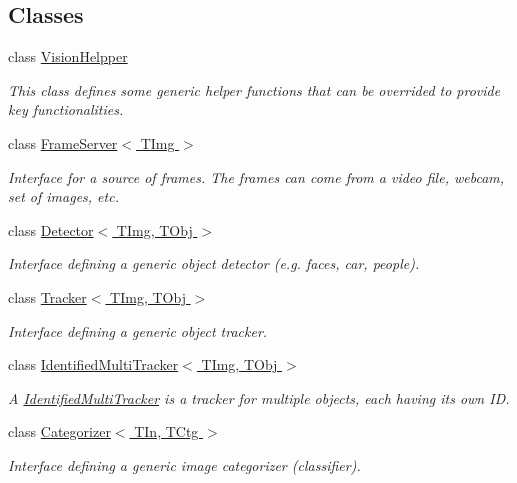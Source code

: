 \subsection*{Classes}
\begin{DoxyCompactItemize}
\item 
class \hyperlink{class_vision_core_1_1_abstractions_1_1_vision_helpper}{Vision\+Helpper}
\begin{DoxyCompactList}\small\item\em This class defines some generic helper functions that can be overrided to provide key functionalities. \end{DoxyCompactList}\item 
class \hyperlink{class_vision_core_1_1_interfaces_1_1_frame_server}{Frame\+Server$<$ T\+Img $>$}
\begin{DoxyCompactList}\small\item\em Interface for a source of frames. The frames can come from a video file, webcam, set of images, etc. \end{DoxyCompactList}\item 
class \hyperlink{class_vision_core_1_1_interfaces_1_1_detector}{Detector$<$ T\+Img, T\+Obj $>$}
\begin{DoxyCompactList}\small\item\em Interface defining a generic object detector (e.\+g. faces, car, people). \end{DoxyCompactList}\item 
class \hyperlink{class_vision_core_1_1_interfaces_1_1_tracker}{Tracker$<$ T\+Img, T\+Obj $>$}
\begin{DoxyCompactList}\small\item\em Interface defining a generic object tracker. \end{DoxyCompactList}\item 
class \hyperlink{class_vision_core_1_1_interfaces_1_1_identified_multi_tracker}{Identified\+Multi\+Tracker$<$ T\+Img, T\+Obj $>$}
\begin{DoxyCompactList}\small\item\em A \hyperlink{class_vision_core_1_1_interfaces_1_1_identified_multi_tracker}{Identified\+Multi\+Tracker} is a tracker for multiple objects, each having its own I\+D. \end{DoxyCompactList}\item 
class \hyperlink{class_vision_core_1_1_interfaces_1_1_categorizer}{Categorizer$<$ T\+In, T\+Ctg $>$}
\begin{DoxyCompactList}\small\item\em Interface defining a generic image categorizer (classifier). \end{DoxyCompactList}\end{DoxyCompactItemize}


